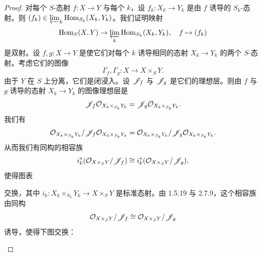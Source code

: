 \begin{proof}
对每个 $S$-态射 $f\colon X\to Y$ 与每个 $k$，设 $f_k\colon X_k\to Y_k$ 是由 $f$ 诱导的 $S_k$-态射。则 $(f_k)\in\varprojlim_k\operatorname{Hom}_{S_k}(X_k,Y_k)$。我们证明映射
\begin{equation*}
\operatorname{Hom}_S(X,Y)\to\varprojlim_k\operatorname{Hom}_{S_k}(X_k,Y_k),\quad f\mapsto(f_k)
\end{equation*}
是双射。设 $f,g\colon X\to Y$ 是使它们对每个 $k$ 诱导相同的态射 $X_k\to Y_k$ 的两个 $S$-态射。考虑它们的图像
\begin{equation*}
\Gamma_f,\Gamma_g\colon X\to X\times_S Y.
\end{equation*}
由于 $Y$ 在 $S$ 上分离，它们是闭浸入。设 $\mathscr{J}_f$ 与 $\mathscr{J}_g$ 是它们的理想层。则由 $f$ 与 $g$ 诱导的态射 $X_k\to Y_k$ 的图像理想层是
\begin{equation*}
\mathscr{J}_f\mathcal{O}_{X_k\times_{S_k}Y_k}=\mathscr{J}_g\mathcal{O}_{X_k\times_{S_k}Y_k}.
\end{equation*}
我们有
\begin{equation*}
\mathcal{O}_{X_k\times_{S_k}Y_k}/\mathscr{J}_f\mathcal{O}_{X_k\times_{S_k}Y_k}=\mathcal{O}_{X_k\times_{S_k}Y_k}/\mathscr{J}_g\mathcal{O}_{X_k\times_{S_k}Y_k}.
\end{equation*}
从而我们有同构的相容族
\begin{equation*}
i_k^*(\mathcal{O}_{X\times_S Y}/\mathscr{J}_f)\cong i_k^*(\mathcal{O}_{X\times_S Y}/\mathscr{J}_g),
\end{equation*}
使得图表
\begin{center}
\end{center}
交换，其中 $i_k\colon X_k\times_{S_k}Y_k\to X\times_S Y$ 是标准态射。由 1.5.19 与 2.7.9，这个相容族由同构
\begin{equation*}
\mathcal{O}_{X\times_S Y}/\mathscr{J}_f\cong\mathcal{O}_{X\times_S Y}/\mathscr{J}_g
\end{equation*}
诱导，使得下图交换：
\begin{center}
\end{center}
\end{proof}
